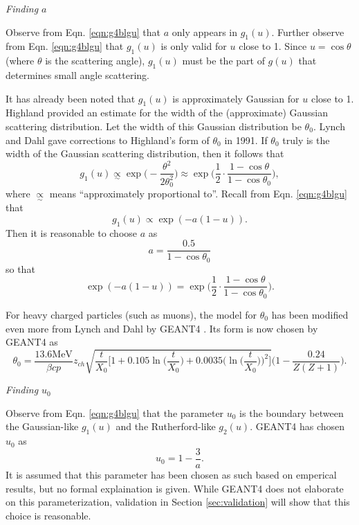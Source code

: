 \noindent \textit{\large{Finding $a$}}

Observe from Eqn. \ref{eqn:g4blgu} that $a$ only appears in $g_1(u)$. Further observe from Eqn. \ref{eqn:g4blgu} that $g_1(u)$ is only valid for $u$ close to 1. Since $u=\cos\theta$ (where $\theta$ is the scattering angle), $g_1(u)$ must be the part of $g(u)$ that determines small angle scattering. 

It has already been noted that $g_1(u)$ is approximately Gaussian for $u$ close to 1. Highland \cite{highland} provided an estimate for the width of the (approximate) Gaussian scattering distribution. Let the width of this Gaussian distribution be $\theta_0$. Lynch and Dahl \cite{lynchdahl} gave corrections to Highland's form of $\theta_0$ in 1991. If $\theta_0$ truly is the width of the Gaussian scattering distribution, then it follows that
%
\begin{equation}\nonumber
g_1(u) \underset{\sim}{\propto} \exp{\Big(-\frac{\theta^2}{2\theta_0^2}\Big)} \approx \exp\Big(\frac{1}{2}\cdot\frac{1-\cos\theta}{1-\cos\theta_0}\Big),
\end{equation}
%
where $\underset{\sim}{\propto}$ means ``approximately proportional to''. Recall from Eqn. \ref{eqn:g4blgu} that
\begin{equation}\nonumber
g_1(u)\propto \exp{(-a(1-u))}.
\end{equation}
Then it is reasonable to choose $a$ as
%
\begin{equation}
a=\frac{0.5}{1-\cos\theta_0}
\label{eqn:geanta}
\end{equation}
%
so that
%
\begin{equation}\nonumber
\exp{(-a(1-u))}=\exp\Big(\frac{1}{2}\cdot\frac{1-\cos\theta}{1-\cos\theta_0}\Big).
\end{equation}
%

 For heavy charged particles (such as muons), the model for $\theta_0$ has been modified even more from Lynch and Dahl by GEANT4 \cite{geant4}. Its form is now chosen by GEANT4 \cite{geant4} as
%
\begin{equation}\label{g4bltheta0}
\theta_0=\frac{13.6 \text{MeV}}{\beta c p}z_{ch}\sqrt{\frac{t}{X_0}\Big[ 1+0.105\ln\Big(\frac{t}{X_0}\Big)+0.0035\Big(\ln\Big(\frac{t}{X_0}\Big)\Big)^2 \Big]}\Big(1-\frac{0.24}{Z(Z+1)}\Big).
\end{equation}

\noindent \textit{\large{Finding $u_0$}}

Observe from Eqn. \ref{eqn:g4blgu} that the parameter $u_0$ is the boundary between the Gaussian-like $g_1(u)$ and the Rutherford-like $g_2(u)$. GEANT4 \cite{geant4} has chosen $u_0$ as
\begin{equation}
u_0=1-\frac{3}{a}.
\label{eqn:geantu0}
\end{equation}
It is assumed that this parameter has been chosen as such based on emperical results, but no formal explaination is given. While GEANT4 \cite{geant4} does not elaborate on this parameterization, validation in Section \ref{sec:validation} will show that this choice is reasonable.

